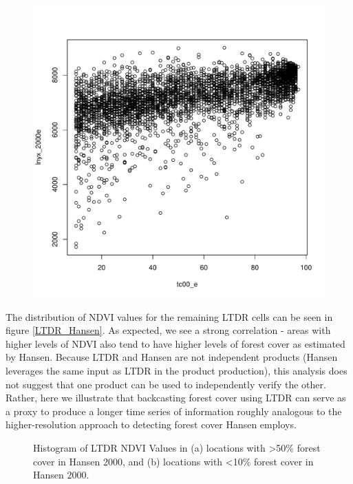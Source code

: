 \documentclass{article}\usepackage[]{graphicx}\usepackage[]{color}
\newenvironment{knitrout}{}{}  %
\begin{document}
\begin{knitrout}
\begin{figure}[H]
\begin{Schunk}
\includegraphics[width=0.8\linewidth]{figure/LTDR_NDVI-1} \end{Schunk}
\end{figure}
The distribution of NDVI values for the remaining LTDR cells can be seen in figure \ref{LTDR_Hansen}.  
As expected, we see a strong correlation - areas with higher levels of NDVI also tend to have higher levels of forest cover as estimated by Hansen.  
Because LTDR and Hansen are not independent products (Hansen leverages the same input as LTDR in the product production), this analysis does not suggest that one product can be used to independently verify the other.  
Rather, here we illustrate that backcasting forest cover using LTDR can serve as a proxy to produce a longer time series of information roughly analogous to the higher-resolution approach to detecting forest cover Hansen employs.
\begin{figure}[H]
\caption{Histogram of LTDR NDVI Values in (a) locations with >50\% forest cover in Hansen 2000, and (b) locations with <10\% forest cover in Hansen 2000.}
\label{NDVI_Hansen_hist}
\centering
\begin{Schunk}


\end{Schunk}
\end{figure}
\end{knitrout}
\end{document}
